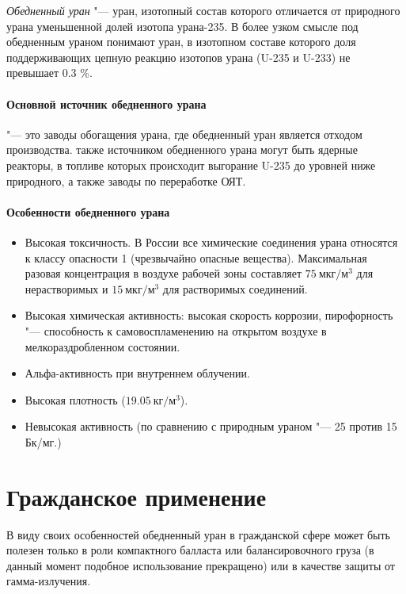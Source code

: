 



\emph{Обедненный уран} "--- уран, изотопный состав которого отличается от природного урана уменьшенной долей изотопа урана-235. В более узком смысле под обедненным ураном понимают уран, в изотопном составе которого доля поддерживающих цепную реакцию изотопов урана (U-235 и U-233) не превышает 0.3 \%.

\paragraph{Основной источник обедненного урана} "--- это заводы обогащения урана, где обедненный уран является отходом производства. также источником обедненного урана могут быть ядерные реакторы, в топливе которых происходит выгорание U-235 до уровней ниже природного, а также заводы по переработке ОЯТ.

\paragraph{Особенности обедненного урана}

\begin{itemize}
	\item Высокая токсичность. В России все химические соединения урана относятся к классу опасности 1 (чрезвычайно опасные вещества). Максимальная разовая концентрация в воздухе рабочей зоны составляет $75~мкг/м^3$ для нерастворимых и $15~мкг/м^3$ для растворимых соединений.
	\item Высокая химическая активность: высокая скорость коррозии, пирофорность "--- способность к самовоспламенению на открытом воздухе в мелкораздробленном состоянии.
	\item Альфа-активность при внутреннем облучении.
	\item Высокая плотность ($19.05~кг/м^3$). 
	\item Невысокая активность (по сравнению с природным ураном "--- 25 против 15 Бк/мг.)
\end{itemize}

\section{Гражданское применение}
В виду своих особенностей обедненный уран в гражданской сфере может быть полезен только в роли компактного балласта или балансировочного груза (в данный момент подобное использование прекращено) или в качестве защиты от гамма-излучения.


